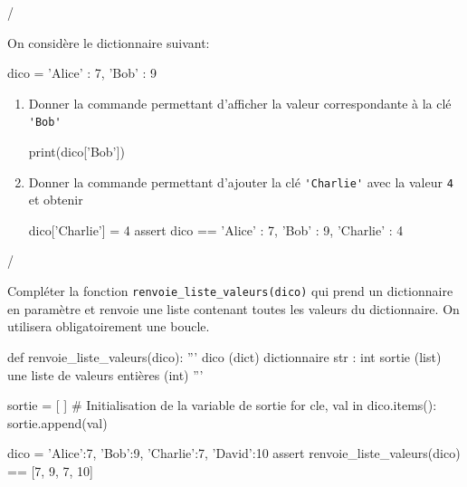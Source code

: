 \documentclass[a4paper]{article}
\begin{document}
\begin{exerciceinterro}{\hspace{2cm}\dotfill/}{}

On considère le dictionnaire suivant:

\begin{CodePythontexAlt}[Largeur=17cm,
TaillePolice = \normalsize, 
EspacementVertical = 1.2,
Lignes=false]{}
dico = {'Alice' : 7, 'Bob' : 9}
\end{CodePythontexAlt}


\begin{enumerate}
\item Donner la commande permettant d'afficher la valeur correspondante à la clé \verb+'Bob'+


\begin{CodePythontexAlt}[Largeur=17cm,
TaillePolice = \normalsize, 
EspacementVertical = 1.2,
Lignes=false]{}
print(dico['Bob'])
\end{CodePythontexAlt}
\item Donner la commande permettant d'ajouter la clé \verb+'Charlie'+ avec la valeur \verb+4+ et obtenir 

\begin{CodePythontexAlt}[Largeur=17cm,
TaillePolice = \normalsize, 
EspacementVertical = 1.2,
Lignes=false]{}
dico['Charlie'] = 4
assert dico == {'Alice' : 7, 'Bob' : 9, 'Charlie' : 4}
\end{CodePythontexAlt}

\end{enumerate}

\end{exerciceinterro}

\medskip

\newpage
\pagestyle{DS_LP}


\begin{exerciceinterro}{\hspace{2cm}\dotfill/}{}


 Compléter la fonction \verb+renvoie_liste_valeurs(dico)+ qui prend un dictionnaire en paramètre et renvoie une liste contenant toutes les valeurs du dictionnaire. On utilisera obligatoirement une boucle.


\begin{CodePythontexAlt}[Largeur=17cm,
TaillePolice = \normalsize, 
EspacementVertical = 1.2,
Lignes=false]{}
def renvoie_liste_valeurs(dico):
	''' dico (dict)  dictionnaire {str : int}
	sortie (list) une liste de valeurs entières (int) '''

	sortie = [ ] # Initialisation de la variable de sortie
	for cle, val in dico.items():
		sortie.append(val)	

dico = {'Alice':7, 'Bob':9, 'Charlie':7, 'David':10}	
assert renvoie_liste_valeurs(dico) == [7, 9, 7, 10]
	
\end{CodePythontexAlt}

\end{exerciceinterro}
\end{document}
